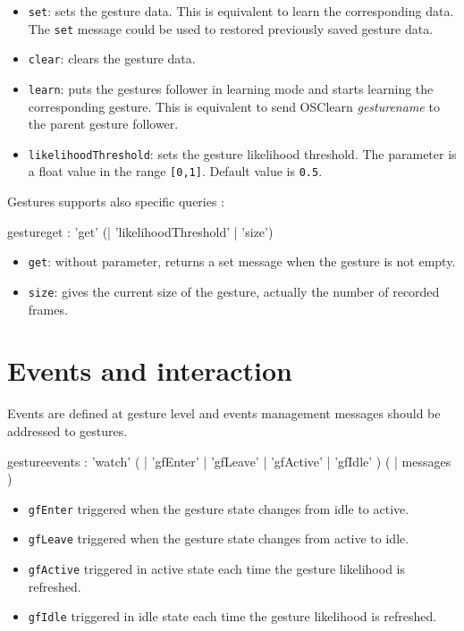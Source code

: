 \documentclass[a4paper,twoside]{report}
\newcommand{\sublevel}[1]	{\section{#1}}
\newcommand{\OSC}[1]		{\texttt{#1}}
\newcommand{\values}[1]	{\texttt{#1}}
\begin{document}
\begin{itemize}
\item \OSC{set}: sets the gesture data. This is equivalent to learn the corresponding data. The \OSC{set} message could be used to restored previously saved gesture data.
\item \OSC{clear}: clears the gesture data. 
\item \OSC{learn}: puts the gestures follower in learning mode and starts learning the corresponding gesture. This is equivalent to send OSC{learn \textit{gesturename}} to the parent gesture follower.
\item \OSC{likelihoodThreshold}: sets the gesture likelihood threshold. The parameter is a float value in the range \values{[0,1]}. Default value is \values{0.5}.
\end{itemize}

Gestures supports also specific queries :
\begin{rail}
gestureget : 'get' (| 'likelihoodThreshold' | 'size')
\end{rail}

\begin{itemize}
\item \OSC{get}: without parameter, returns a set message when the gesture is not empty.
\item \OSC{size}: gives the current size of the gesture, actually the number of recorded frames. 
\end{itemize}


\sublevel{Events and interaction}\label{gfevents}

Events are defined at gesture level and events management messages should be addressed to gestures. 

\begin{rail}
gestureevents :
		  	'watch' ( | 'gfEnter' | 'gfLeave' | 'gfActive' | 'gfIdle' )  (  |  messages )
\end{rail}

\begin{itemize}
\item \OSC{gfEnter} triggered when the gesture state changes from idle to active.
\item \OSC{gfLeave} triggered when the gesture state changes from active to idle.
\item \OSC{gfActive} triggered in active state each time the gesture likelihood is refreshed.
\item \OSC{gfIdle} triggered in idle state each time the gesture likelihood is refreshed.
\end{itemize}
\end{document}
